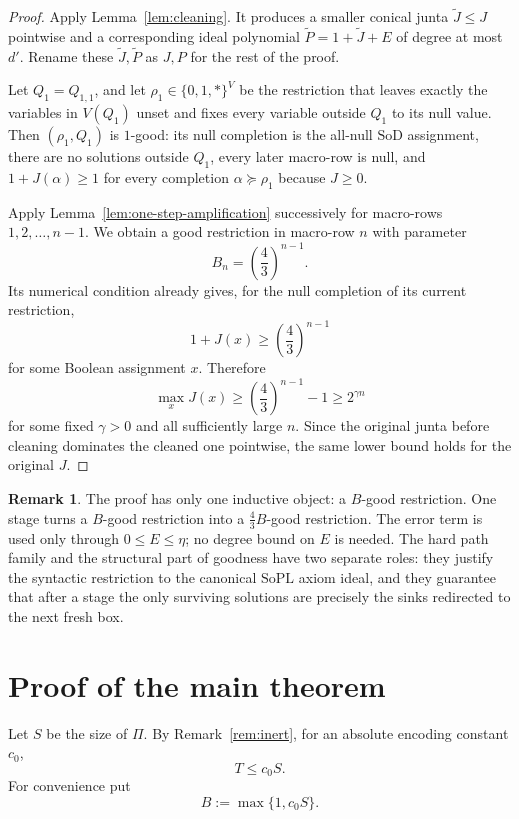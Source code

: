 \documentclass[11pt]{article}
\theoremstyle{definition}
\newtheorem{remark}[theorem]{Remark}
\newcommand{\SoPL}{\mathrm{SoPL}}
\newcommand{\SoD}{\mathrm{SoD}}
\begin{document}
\begin{proof}
Apply Lemma~\ref{lem:cleaning}.  It produces a smaller conical junta
$\widetilde J\le J$ pointwise and a corresponding ideal polynomial
$\widetilde P=1+\widetilde J+E$ of degree at most $d'$.  Rename these
$\widetilde J,\widetilde P$ as $J,P$ for the rest of the proof.

Let $Q_1=Q_{1,1}$, and let $\rho_1\in\{0,1,*\}^{V}$ be the restriction that
leaves exactly the variables in $V(Q_1)$ unset and fixes every variable outside
$Q_1$ to its null value.  Then $(\rho_1,Q_1)$ is $1$-good: its null completion is the
all-null $\SoD$ assignment, there are no solutions outside $Q_1$, every later
macro-row is null, and $1+J(\alpha)\ge1$ for every completion
$\alpha\succeq\rho_1$ because $J\ge0$.

Apply Lemma~\ref{lem:one-step-amplification} successively for macro-rows
$1,2,\ldots,n-1$.  We obtain a good restriction in macro-row $n$ with parameter
\[
  B_n=\left(\frac43\right)^{n-1}.
\]
Its numerical condition already gives, for the null completion of its current restriction,
\[
  1+J(x)\ge\left(\frac43\right)^{n-1}
\]
for some Boolean assignment $x$.  Therefore
\[
  \max_xJ(x)
  \ge\left(\frac43\right)^{n-1}-1
  \ge2^{\gamma n}
\]
for some fixed $\gamma>0$ and all sufficiently large $n$.  Since the original junta
before cleaning dominates the cleaned one pointwise, the same lower bound holds for
the original $J$.
\end{proof}

\begin{remark}
The proof has only one inductive object: a $B$-good restriction.  One stage turns a
$B$-good restriction into a $\frac43B$-good restriction.  The error term is used only through
$0\le E\le\eta$; no degree bound on $E$ is needed.  The hard path family and the
structural part of goodness have two separate roles: they justify the syntactic
restriction to the canonical $\SoPL$ axiom ideal, and they guarantee that after a
stage the only surviving solutions are precisely the sinks redirected to the next
fresh box.
\end{remark}


\section{Proof of the main theorem}\label{sec:main-proof}

Let $S$ be the size of $\Pi$.
By Remark~\ref{rem:inert}, for an absolute encoding constant $c_0$,
\[
  T\le c_0S.
  \tag{7.1}\label{eq:TleS}
\]
For convenience put
\[
  B:=\max\{1,c_0S\}.
\]
\end{document}
